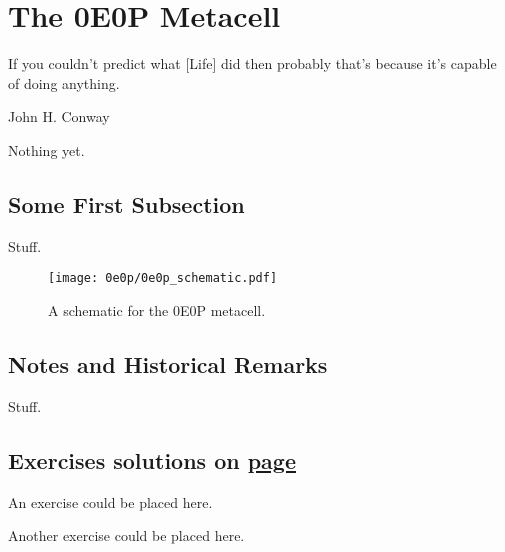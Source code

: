 
\renewcommand{\chapterfolder}{0e0p/}
\chapter{The 0E0P Metacell}\label{chp:0e0p}


\vspace*{-0.4in}
\epigraph{If you couldn't predict what [Life] did then probably that's because it's capable of doing anything.}{John H. Conway}
\vspace*{0.4in}


\noindent Nothing yet.


\section{Some First Subsection}

Stuff.

\begin{figure}[!htb]
	\centering
	\texttt{[image: 0e0p/0e0p\_schematic.pdf]}
	\caption{A schematic for the 0E0P metacell.}\label{fig:0e0p_schematic}
\end{figure}


\section*{Notes and Historical Remarks}

Stuff.


\section*{Exercises \hfill \normalfont\textsf{\small solutions on \hyperlink{solutions_0e0p}{page \pageref{solutions_0e0p}}}}
\label{sec:solutions_0e0p}
\vspace*{-0.4cm}\hrulefill\vspace*{-0.3cm}\footnotesize\begin{multicols}{2}\vspace*{-0.4cm}\raggedcolumns{}
\setlength{\parskip}{0pt}


\begin{problem}\label{exer:0e0p_ex1}
	An exercise could be placed here.
\end{problem}


\mfilbreak


\begin{problem}\label{exer:0e0p_ex2}
	Another exercise could be placed here.
\end{problem}


\end{multicols}
\normalsize\vspace*{0.01cm}
